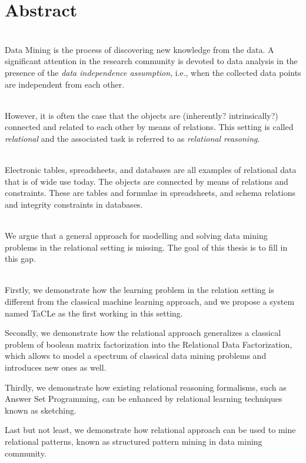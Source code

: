 \chapter{Abstract} \label{ch:abstract}
\\
Data Mining is the process of discovering new knowledge from the data.
A significant attention in the research community is devoted to data
analysis in the presence of the \textit{data independence assumption}, i.e.,
when the collected data points are independent from each other.

\\
However, it is often the case that the objects are 
(inherently? intrinsically?) 
connected and related to each other by means of relations. 
This setting is called \textit{relational} and the associated task 
is referred to as \textit{relational reasoning}.

\\
Electronic tables, spreadsheets, and databases are all examples of
relational data that is of wide use today. The objects are connected
by means of relations and constraints. These are
tables and formulae in spreadsheets, and  schema relations and integrity
constraints in databases.

\\
We argue that a general approach for modelling and solving data mining  
problems in the relational setting is missing. The goal of this thesis
is to fill in this gap.


\\
Firstly, we demonstrate how the learning problem in the relation
setting is different from the classical machine learning approach, and we
propose a system named TaCLe as the first working in this setting.

Secondly, we demonstrate how the relational approach generalizes a
classical problem of boolean matrix factorization into the Relational
Data Factorization, which allows to model a spectrum of classical data
mining problems and introduces new ones as well.

Thirdly, we demonstrate how existing relational reasoning formalisms,
such as Answer Set Programming, can be enhanced by relational learning
techniques known as sketching.

Last but not least, we demonstrate how relational approach can be used
to mine relational patterns, known as structured pattern mining in
data mining community.


\cleardoublepage

